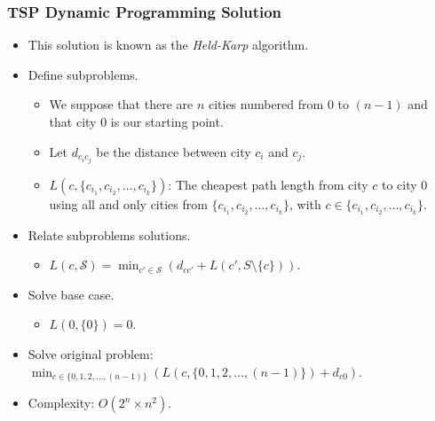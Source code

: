 \documentclass{beamer}
\begin{document}
\begin{frame}%
\frametitle{TSP Dynamic Programming Solution}

\footnotesize

\begin{itemize}

\item This solution is known as the \emph{Held-Karp} algorithm.

\vspace{0.1cm}

\item<2-> Define subproblems.
\begin{itemize}
\footnotesize
\item<2-> We suppose that there are $n$ cities numbered from $0$ to $(n-1)$ and that city $0$ is our starting point.
\vspace{0.05cm}
\item<2-> Let $d_{c_ic_j}$ be the distance between city $c_i$ and $c_j$.
\vspace{0.05cm}
\item<3-> $L(c, \{c_{i_1}, c_{i_2}, \ldots, c_{i_k}\})$: The cheapest path length from city $c$ to city $0$ using all and only
cities from $\{c_{i_1}, c_{i_2}, \ldots, c_{i_k}\}$, with $c \in \{c_{i_1}, c_{i_2}, \ldots, c_{i_k}\}$.
\end{itemize}

\vspace{0.1cm}

\item<4-> Relate subproblems solutions.
\begin{itemize}
\footnotesize
\item<4-> $L(c, \mathcal{S}) = \min_{c' \in \mathcal{S}} (d_{cc'} + L(c', S \setminus \{c\}))$.
\end{itemize}

\vspace{0.1cm}

\item<5-> Solve base case.
\begin{itemize}
\footnotesize
\item<5-> $L(0, \{0\}) = 0$.
\end{itemize}

\vspace{0.1cm}

\item<6-> Solve original problem: $\min_{c \in \{0, 1, 2, \ldots, (n - 1)\}} \left(L(c, \{0, 1, 2, \ldots, (n - 1)\}) + d_{c0}\right)$.

\vspace{0.1cm}

\item<7-> Complexity: $O(2^n\times n^2)$.
\end{itemize}

\end{frame}
\end{document}
